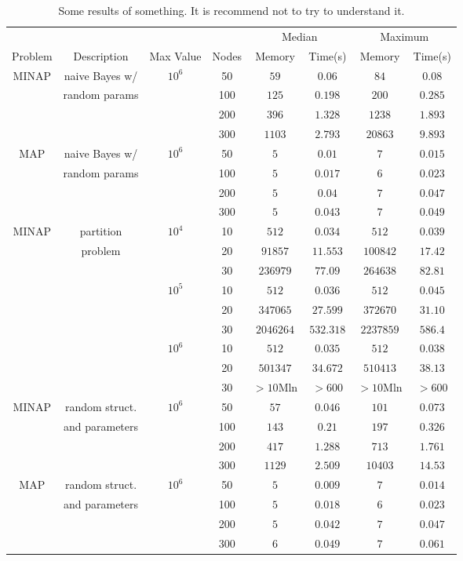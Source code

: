 \documentclass{article}
\begin{document}
\begin{table}[ht]
\caption{Some results of something. It is recommend not to try to understand it.\label{table:somethinginside}}
\begin{center}
\begin{tabular}{cccc|cc|cc}
& & & & \multicolumn{2}{c|}{Median} & \multicolumn{2}{c}{Maximum}\\ 
Problem & Description & Max Value & Nodes & Memory & Time(s) & Memory & Time(s)\\
\hline
MINAP & naive Bayes w/ & $10^{6}$ & 50 & $59$ & $0.06$ & $84$ & $0.08$ \\
 & random params   &   & 100 & $125$ & $0.198$ & $200$ & $0.285$ \\
 &  &   & 200 & $396$ & $1.328$ & $1238$ & $1.893$ \\
 &   &   & 300 & $1103$ & $2.793$ & $20863$ & $9.893$ \\
MAP & naive Bayes w/ & $10^{6}$ & 50 & $5$ & $0.01$ & $7$ & $0.015$ \\
 &  random params  &   & 100 & $5$ & $0.017$ & $6$ & $0.023$ \\
 &   &   & 200 & $5$ & $0.04$ & $7$ & $0.047$ \\
 &   &   & 300 & $5$ & $0.043$ & $7$ & $0.049$ \\
MINAP & partition & $10^{4}$ & 10 & $512$ & $0.034$ & $512$ & $0.039$ \\
 & problem  &   & 20 & $91857$ & $11.553$ & $100842$ & $17.42$ \\
 &   &   & 30 & $236979$ & $77.09$ & $264638$ & $82.81$ \\
 &  & $10^{5}$ & 10 & $512$ & $0.036$ & $512$ & $0.045$ \\
 &   &   & 20 & $347065$ & $27.599$ & $372670$ & $31.10$ \\
 &   &   & 30 & $2046264$ & $532.318$ & $2237859$ & $586.4$ \\
 &  & $10^{6}$ & 10 & $512$ & $0.035$ & $512$ & $0.038$ \\
 &   &   & 20 & $501347$ & $34.672$ & $510413$ & $38.13$ \\
 &   &   & 30 & $>10$Mln & $>600$ & $>10$Mln & $>600$ \\
MINAP & random struct. & $10^{6}$ & 50 & $57$ & $0.046$ & $101$ & $0.073$ \\
 & and parameters  &   & 100 & $143$ & $0.21$ & $197$ & $0.326$ \\
 &   &   & 200 & $417$ & $1.288$ & $713$ & $1.761$ \\
 &   &   & 300 & $1129$ & $2.509$ & $10403$ & $14.53$ \\
MAP & random struct. & $10^{6}$ & 50 & $5$ & $0.009$ & $7$ & $0.014$ \\
 & and parameters  &   & 100 & $5$ & $0.018$ & $6$ & $0.023$ \\
 &   &   & 200 & $5$ & $0.042$ & $7$ & $0.047$ \\
 &   &   & 300 & $6$ & $0.049$ & $7$ & $0.061$ \\
\hline
\end{tabular}
\end{center}
\end{table}

\lipsum[1-4]
\end{document}
